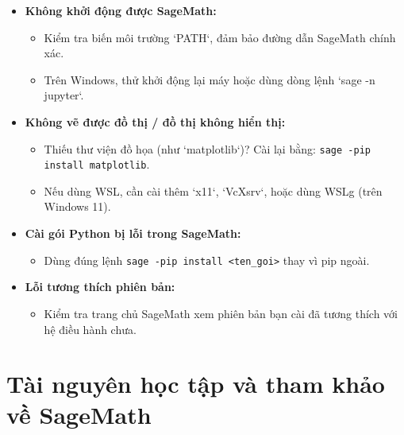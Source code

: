 \begin{itemize}
	\item \textbf{Không khởi động được SageMath:}
	\begin{itemize}
		\item Kiểm tra biến môi trường `PATH`, đảm bảo đường dẫn SageMath chính xác.
		\item Trên Windows, thử khởi động lại máy hoặc dùng dòng lệnh `sage -n jupyter`.
	\end{itemize}
	
	\item \textbf{Không vẽ được đồ thị / đồ thị không hiển thị:}
	\begin{itemize}
		\item Thiếu thư viện đồ họa (như `matplotlib`)? Cài lại bằng: \texttt{sage -pip install matplotlib}.
		\item Nếu dùng WSL, cần cài thêm `x11`, `VcXsrv`, hoặc dùng WSLg (trên Windows 11).
	\end{itemize}
	
	\item \textbf{Cài gói Python bị lỗi trong SageMath:}
	\begin{itemize}
		\item Dùng đúng lệnh \texttt{sage -pip install <ten\_goi>} thay vì pip ngoài.
	\end{itemize}
	
	\item \textbf{Lỗi tương thích phiên bản:}
	\begin{itemize}
		\item Kiểm tra trang chủ SageMath xem phiên bản bạn cài đã tương thích với hệ điều hành chưa.
	\end{itemize}
\end{itemize}

\section{Tài nguyên học tập và tham khảo về SageMath}


